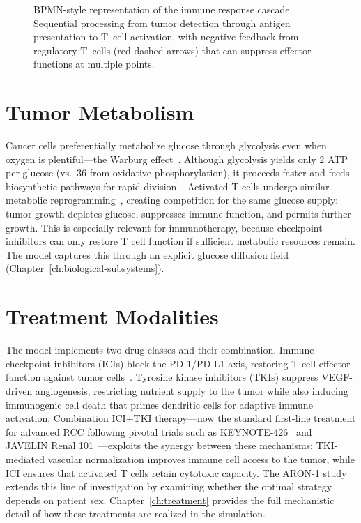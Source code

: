 \begin{figure}[htbp]
\centering
{}
\caption{BPMN-style representation of the immune response cascade. Sequential processing from tumor detection through antigen presentation to T~cell activation, with negative feedback from regulatory T~cells (red dashed arrows) that can suppress effector functions at multiple points.}
\label{fig:immune_cascade_bpmn}
\end{figure}

\section{Tumor Metabolism}
\label{sec:bg_metabolism}

Cancer cells preferentially metabolize glucose through glycolysis even when oxygen is plentiful---the Warburg effect~\cite{liberti2016}.  Although glycolysis yields only 2 ATP per glucose (vs.\ 36 from oxidative phosphorylation), it proceeds faster and feeds biosynthetic pathways for rapid division~\cite{vander_heiden2009}.  Activated T cells undergo similar metabolic reprogramming~\cite{chang2015}, creating competition for the same glucose supply: tumor growth depletes glucose, suppresses immune function, and permits further growth.  This is especially relevant for immunotherapy, because checkpoint inhibitors can only restore T cell function if sufficient metabolic resources remain.  The model captures this through an explicit glucose diffusion field (Chapter~\ref{ch:biological-subsystems}).

\section{Treatment Modalities}
\label{sec:bg_treatments}

The model implements two drug classes and their combination. Immune checkpoint inhibitors (ICIs) block the PD-1/PD-L1 axis, restoring T cell effector function against tumor cells~\cite{pardoll2012, ribas2018}. Tyrosine kinase inhibitors (TKIs) suppress VEGF-driven angiogenesis, restricting nutrient supply to the tumor while also inducing immunogenic cell death that primes dendritic cells for adaptive immune activation. Combination ICI+TKI therapy---now the standard first-line treatment for advanced RCC following pivotal trials such as KEYNOTE-426~\cite{rini2019} and JAVELIN Renal 101~\cite{motzer2019}---exploits the synergy between these mechanisms: TKI-mediated vascular normalization improves immune cell access to the tumor, while ICI ensures that activated T cells retain cytotoxic capacity. The ARON-1 study~\cite{santoni2024} extends this line of investigation by examining whether the optimal strategy depends on patient sex. Chapter~\ref{ch:treatment} provides the full mechanistic detail of how these treatments are realized in the simulation.

